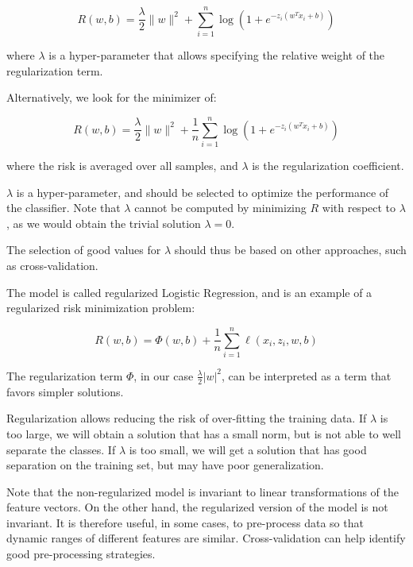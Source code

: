 \begin{equation*}
R(w, b) = \frac{\lambda}{2} \|w\|^2 + \sum_{i=1}^n \log(1 + e^{-z_i (w^T x_i + b)})
\end{equation*}

where $\lambda$ is a hyper-parameter that allows specifying the relative weight of the regularization term.

Alternatively, we look for the minimizer of:


\begin{equation*}
R(w, b) = \frac{\lambda}{2} \|w\|^2 + \frac{1}{n} \sum_{i=1}^n \log(1 + e^{-z_i (w^T x_i + b)})
\end{equation*}

where the risk is averaged over all samples, and $\lambda$ is the regularization coefficient.

$\lambda$ is a hyper-parameter, and should be selected to optimize the performance of the classifier. Note that $\lambda$ cannot be computed by minimizing $R$ with respect to $\lambda$, as we would obtain the trivial solution $\lambda = 0$.

The selection of good values for $\lambda$ should thus be based on other approaches, such as cross-validation.

The model is called regularized Logistic Regression, and is an example of a regularized risk minimization problem:


\begin{equation*}
R(w, b) = \Phi(w, b) + \frac{1}{n} \sum_{i=1}^n \ell(x_i, z_i, w, b)
\end{equation*}

The regularization term $\Phi$, in our case $\frac{\lambda}{2} |w|^2$, can be interpreted as a term that favors simpler solutions.

Regularization allows reducing the risk of over-fitting the training data. If $\lambda$ is too large, we will obtain a solution that has a small norm, but is not able to well separate the classes. If $\lambda$ is too small, we will get a solution that has good separation on the training set, but may have poor generalization.

Note that the non-regularized model is invariant to linear transformations of the feature vectors. On the other hand, the regularized version of the model is not invariant. It is therefore useful, in some cases, to pre-process data so that dynamic ranges of different features are similar. Cross-validation can help identify good pre-processing strategies.

